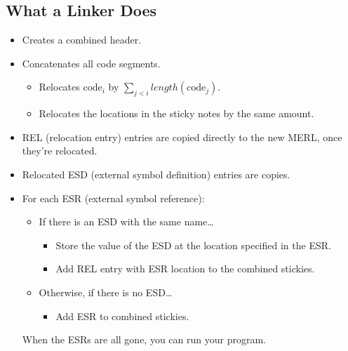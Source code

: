 \documentclass[]{article}
\theoremstyle{definition}
\begin{document}
			\subsection{What a Linker Does}
				\begin{itemize}
					\item Creates a combined header.
					\item Concatenates all code segments.
						\begin{itemize}
							\item Relocates $\text{code}_i$ by $\sum_{j < i} length(\text{code}_j)$.
							\item Relocates the locations in the sticky notes by the same amount.
						\end{itemize}
					\item REL (relocation entry) entries are copied directly to the new MERL, once they're relocated.
					\item Relocated ESD (external symbol definition) entries are copies.
					\item For each ESR (external symbol reference):
						\begin{itemize}
							\item If there is an ESD with the same name\dots
								\begin{itemize}
									\item Store the value of the ESD at the location specified in the ESR.
									\item Add REL entry with ESR location to the combined stickies.
								\end{itemize}
							\item Otherwise, if there is no ESD\dots
								\begin{itemize}
									\item Add ESR to combined stickies.
								\end{itemize}
						\end{itemize}

						When the ESRs are all gone, you can run your program.
				\end{itemize}
\end{document}
